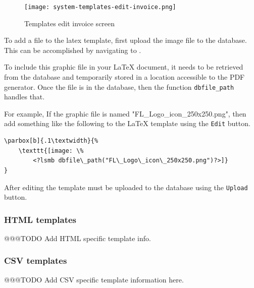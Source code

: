 \begin{figure}[h]
        \centering
        \texttt{[image: system-templates-edit-invoice.png]}
        \caption{Templates edit invoice screen}
        \label{fig:system-templates-edit-invoice}
\end{figure}

To add a file to the latex template, first upload the image file to the database.  
This can be accomplished by navigating to .

To include this graphic file in your \LaTeX{} document, it needs to be retrieved from
the database and temporarily stored in a location accessible to the PDF
generator. Once the file is in the database, then the function \texttt{dbfile\_path} handles that.

For example, If the graphic file is named "FL\_Logo\_icon\_250x250.png", then add something like the following to the \LaTeX{} template using the \texttt{Edit} button.

\begin{verbatim}
\parbox[b]{.1\textwidth}{%
    \texttt{[image: \%
        <?lsmb dbfile\_path("FL\_Logo\_icon\_250x250.png")?>]}
}
\end{verbatim}

After editing the template must be uploaded to the database using the \texttt{Upload} button.

\subsubsection{HTML templates}
\label{subsec-company-config-html-templates}

@@@TODO Add HTML specific template info.

\subsubsection{CSV templates}
\label{subsec-company-config-csv-templates}

@@@TODO Add CSV specific template information here.

